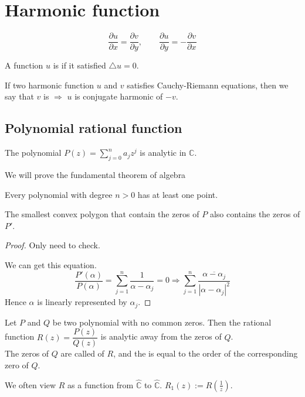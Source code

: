 \section{Harmonic function}
\begin{definition}
    \[\frac{\partial u}{\partial x}=\frac{\partial v}{\partial y},\qquad\frac{\partial u }{\partial y}=-\frac{\partial v}{\partial x}\]
\end{definition}
\begin{definition}
    A function  $ u  $ is  if it satisfied   $ \triangle u=0 $. 
    
    If two harmonic function  $ u  $ and  $ v  $ satisfies Cauchy-Riemann equations, then we say that  $ v  $ is  $ \Rightarrow  $  $ u  $ is conjugate harmonic of  $ -v  $.
\end{definition}
\subsection{Polynomial rational function}
The polynomial  $ P(z)=\sum\limits_{j=0}^na_jz^j $ is analytic in  $ \mathbb{C} $.

We will prove the fundamental theorem of algebra
\begin{theorem}
    Every polynomial with degree  $ n>0 $ has at least one point. 
\end{theorem} 
\begin{theorem}
    The smallest convex polygon that contain the zeros of  $ P  $ also contains the zeros of  $ P' $. 
\end{theorem}
\begin{proof}
    Only need to check.
    
    We can get this equation.
    \[\frac{P'(\alpha)}{P(\alpha)}=\sum\limits_{j=1}^n\frac{1 }{\alpha-\alpha_j}=0\Rightarrow \sum\limits_{j=1}^n\frac{\overline{\alpha-\alpha_j}}{|\alpha-\alpha_j|^2}\]
    Hence  $ \alpha  $ is linearly represented by  $ \alpha_j $.
\end{proof}
\begin{proposition}
    Let  $ P  $ and  $ Q  $ be two polynomial with no common zeros. Then the rational function  $ R(z)=\dfrac{P(z)}{Q(z)} $ is analytic away from the zeros of  $ Q $.\\
    The zeros of  $ Q  $ are called  of  $ R  $, and the  is equal to the order of the corresponding zero of  $ Q  $. 
\end{proposition}
We often view  $ R  $ as a function from  $ \hat{\mathbb{C}} $ to  $ \hat{\mathbb{C}} $.  $ R_1(z):=R(\frac{1}{z}) $.

